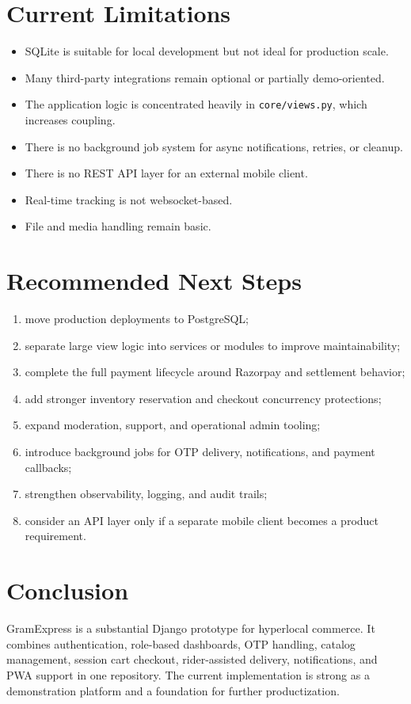 \documentclass[12pt,a4paper]{article}
\begin{document}
\section{Current Limitations}
\begin{itemize}[leftmargin=1.5em]
    \item SQLite is suitable for local development but not ideal for production scale.
    \item Many third-party integrations remain optional or partially demo-oriented.
    \item The application logic is concentrated heavily in \texttt{core/views.py}, which increases coupling.
    \item There is no background job system for async notifications, retries, or cleanup.
    \item There is no REST API layer for an external mobile client.
    \item Real-time tracking is not websocket-based.
    \item File and media handling remain basic.
\end{itemize}

\section{Recommended Next Steps}
\begin{enumerate}[leftmargin=1.5em]
    \item move production deployments to PostgreSQL;
    \item separate large view logic into services or modules to improve maintainability;
    \item complete the full payment lifecycle around Razorpay and settlement behavior;
    \item add stronger inventory reservation and checkout concurrency protections;
    \item expand moderation, support, and operational admin tooling;
    \item introduce background jobs for OTP delivery, notifications, and payment callbacks;
    \item strengthen observability, logging, and audit trails;
    \item consider an API layer only if a separate mobile client becomes a product requirement.
\end{enumerate}

\section{Conclusion}
GramExpress is a substantial Django prototype for hyperlocal commerce. It combines authentication, role-based dashboards, OTP handling, catalog management, session cart checkout, rider-assisted delivery, notifications, and PWA support in one repository. The current implementation is strong as a demonstration platform and a foundation for further productization.
\end{document}
